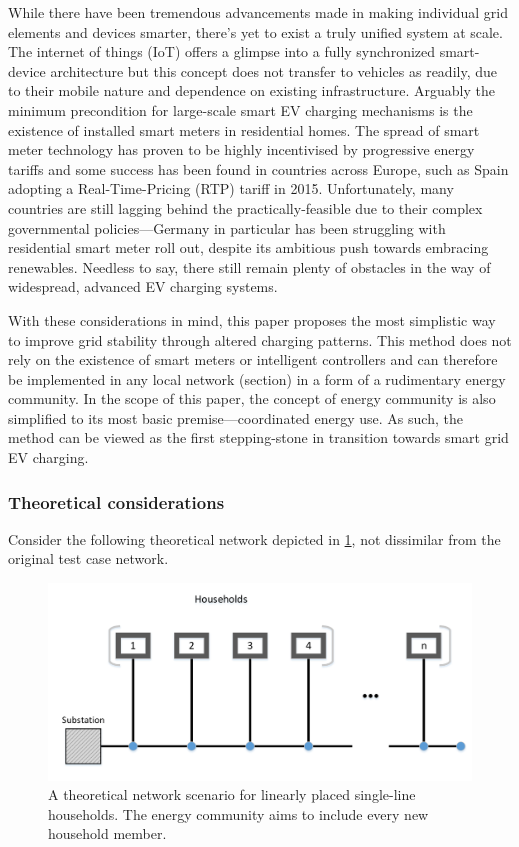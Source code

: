 \documentclass[a4paper,10pt]{report}
\begin{document}
While there have been tremendous advancements made in making individual grid elements and devices smarter, there's yet to exist a truly unified system at scale. The internet of things (IoT) offers a glimpse into a fully synchronized smart-device architecture but this concept does not transfer to vehicles as readily, due to their mobile nature and dependence on existing infrastructure. Arguably the minimum precondition for large-scale smart EV charging mechanisms is the existence of installed smart meters in residential homes. The spread of smart meter technology has proven to be highly incentivised by progressive energy tariffs and some success has been found in countries across Europe, such as Spain adopting a Real-Time-Pricing (RTP) tariff in 2015. Unfortunately, many countries are still lagging behind the practically-feasible due to their complex governmental policies---Germany in particular has been struggling with residential smart meter roll out, despite its ambitious push towards embracing renewables. Needless to say, there still remain plenty of obstacles in the way of widespread, advanced EV charging systems.

With these considerations in mind, this paper proposes the most simplistic way to improve grid stability through altered charging patterns. This method does not rely on the existence of smart meters or intelligent controllers and can therefore be implemented in any local network (section) in a form of a rudimentary energy community. In the scope of this paper, the concept of energy community is also simplified to its most basic premise---coordinated energy use. As such, the method can be viewed as the first stepping-stone in transition towards smart grid EV charging. 

\subsubsection{Theoretical considerations}\label{subsubsection_theoretical_con}

Consider the following theoretical network depicted in \cref{comm_topology}, not dissimilar from the original test case network.

\begin{figure}[htpb]
	\centering
	\includegraphics[width=0.7\linewidth]{comm_topology}
	\caption[Theoretical energy community network scenario]{A theoretical network scenario for linearly placed single-line households. The energy community aims to include every new household member.}
	\label{comm_topology}
\end{figure}
\end{document}
